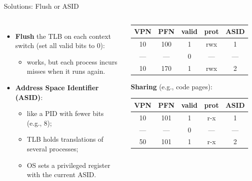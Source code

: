 \begin{frame}{Solutions: Flush or ASID}

\begin{columns}[T]

\small
\begin{itemize}
    \item \textbf{Flush} the TLB on each context switch
          (set all valid bits to 0):
    \begin{itemize}
        \item works, but each process incurs misses when it runs again.
    \end{itemize}
    \item \textbf{Address Space Identifier (ASID)}:
    \begin{itemize}
        \item like a PID with fewer bits (e.g., 8);
        \item TLB holds translations of several processes;
        \item OS sets a privileged register with the current ASID.
    \end{itemize}
\end{itemize}

\footnotesize
\begin{center}
\begin{tabular}{ccccc}
\toprule
VPN & PFN & valid & prot & ASID \\
\midrule
10 & 100 & 1 & rwx & 1 \\
--- & --- & 0 & --- & --- \\
10 & 170 & 1 & rwx & 2 \\
\bottomrule
\end{tabular}

\vspace{0.5cm}

\textbf{Sharing} (e.g., code pages): \\[0.2em]
\begin{tabular}{ccccc}
\toprule
VPN & PFN & valid & prot & ASID \\
\midrule
10 & 101 & 1 & r-x & 1 \\
--- & --- & 0 & --- & --- \\
50 & 101 & 1 & r-x & 2 \\
\bottomrule
\end{tabular}
\end{center}

\end{columns}

\end{frame}

